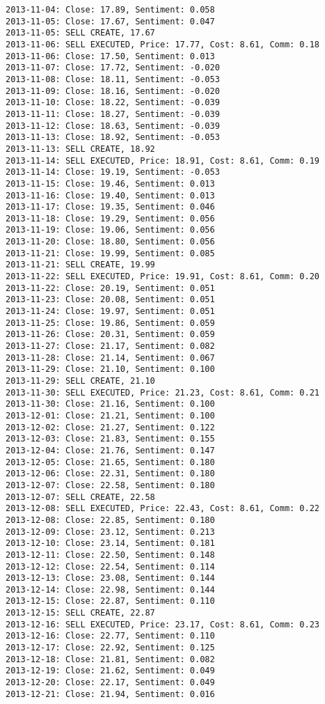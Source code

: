 \documentclass[11pt]{article}
\begin{document}
\begin{Verbatim}[commandchars=\\\{\}]
2013-11-04: Close: 17.89, Sentiment: 0.058
2013-11-05: Close: 17.67, Sentiment: 0.047
2013-11-05: SELL CREATE, 17.67
2013-11-06: SELL EXECUTED, Price: 17.77, Cost: 8.61, Comm: 0.18
2013-11-06: Close: 17.50, Sentiment: 0.013
2013-11-07: Close: 17.72, Sentiment: -0.020
2013-11-08: Close: 18.11, Sentiment: -0.053
2013-11-09: Close: 18.16, Sentiment: -0.020
2013-11-10: Close: 18.22, Sentiment: -0.039
2013-11-11: Close: 18.27, Sentiment: -0.039
2013-11-12: Close: 18.63, Sentiment: -0.039
2013-11-13: Close: 18.92, Sentiment: -0.053
2013-11-13: SELL CREATE, 18.92
2013-11-14: SELL EXECUTED, Price: 18.91, Cost: 8.61, Comm: 0.19
2013-11-14: Close: 19.19, Sentiment: -0.053
2013-11-15: Close: 19.46, Sentiment: 0.013
2013-11-16: Close: 19.40, Sentiment: 0.013
2013-11-17: Close: 19.35, Sentiment: 0.046
2013-11-18: Close: 19.29, Sentiment: 0.056
2013-11-19: Close: 19.06, Sentiment: 0.056
2013-11-20: Close: 18.80, Sentiment: 0.056
2013-11-21: Close: 19.99, Sentiment: 0.085
2013-11-21: SELL CREATE, 19.99
2013-11-22: SELL EXECUTED, Price: 19.91, Cost: 8.61, Comm: 0.20
2013-11-22: Close: 20.19, Sentiment: 0.051
2013-11-23: Close: 20.08, Sentiment: 0.051
2013-11-24: Close: 19.97, Sentiment: 0.051
2013-11-25: Close: 19.86, Sentiment: 0.059
2013-11-26: Close: 20.31, Sentiment: 0.059
2013-11-27: Close: 21.17, Sentiment: 0.082
2013-11-28: Close: 21.14, Sentiment: 0.067
2013-11-29: Close: 21.10, Sentiment: 0.100
2013-11-29: SELL CREATE, 21.10
2013-11-30: SELL EXECUTED, Price: 21.23, Cost: 8.61, Comm: 0.21
2013-11-30: Close: 21.16, Sentiment: 0.100
2013-12-01: Close: 21.21, Sentiment: 0.100
2013-12-02: Close: 21.27, Sentiment: 0.122
2013-12-03: Close: 21.83, Sentiment: 0.155
2013-12-04: Close: 21.76, Sentiment: 0.147
2013-12-05: Close: 21.65, Sentiment: 0.180
2013-12-06: Close: 22.31, Sentiment: 0.180
2013-12-07: Close: 22.58, Sentiment: 0.180
2013-12-07: SELL CREATE, 22.58
2013-12-08: SELL EXECUTED, Price: 22.43, Cost: 8.61, Comm: 0.22
2013-12-08: Close: 22.85, Sentiment: 0.180
2013-12-09: Close: 23.12, Sentiment: 0.213
2013-12-10: Close: 23.14, Sentiment: 0.181
2013-12-11: Close: 22.50, Sentiment: 0.148
2013-12-12: Close: 22.54, Sentiment: 0.114
2013-12-13: Close: 23.08, Sentiment: 0.144
2013-12-14: Close: 22.98, Sentiment: 0.144
2013-12-15: Close: 22.87, Sentiment: 0.110
2013-12-15: SELL CREATE, 22.87
2013-12-16: SELL EXECUTED, Price: 23.17, Cost: 8.61, Comm: 0.23
2013-12-16: Close: 22.77, Sentiment: 0.110
2013-12-17: Close: 22.92, Sentiment: 0.125
2013-12-18: Close: 21.81, Sentiment: 0.082
2013-12-19: Close: 21.62, Sentiment: 0.049
2013-12-20: Close: 22.17, Sentiment: 0.049
2013-12-21: Close: 21.94, Sentiment: 0.016

\end{Verbatim}
\end{document}

